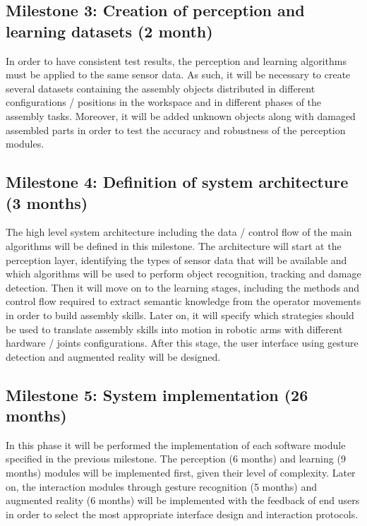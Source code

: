 \subsection{Milestone 3: Creation of perception and learning datasets (2 month)}

In order to have consistent test results, the perception and learning algorithms must be applied to the same sensor data. As such, it will be necessary to create several datasets containing the assembly objects distributed in different configurations / positions in the workspace and in different phases of the assembly tasks. Moreover, it will be added unknown objects along with damaged assembled parts in order to test the accuracy and robustness of the perception modules.


\subsection{Milestone 4: Definition of system architecture (3 months)}

The high level system architecture including the data / control flow of the main algorithms will be defined in this milestone. The architecture will start at the perception layer, identifying the types of sensor data that will be available and which algorithms will be used to perform object recognition, tracking and damage detection. Then it will move on to the learning stages, including the methods and control flow required to extract semantic knowledge from the operator movements in order to build assembly skills. Later on, it will specify which strategies should be used to translate assembly skills into motion in robotic arms with different hardware / joints configurations. After this stage, the user interface using gesture detection and augmented reality will be designed.


\subsection{Milestone 5: System implementation (26 months)}

In this phase it will be performed the implementation of each software module specified in the previous milestone. The perception (6 months) and learning (9 months) modules will be implemented first, given their level of complexity. Later on, the interaction modules through gesture recognition (5 months) and augmented reality (6 months) will be implemented with the feedback of end users in order to select the most appropriate interface design and interaction protocols.


